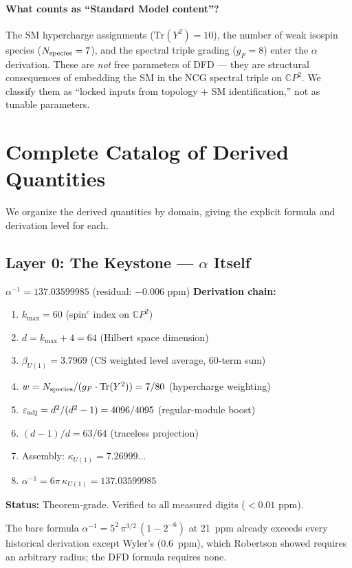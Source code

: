 \documentclass[12pt,a4paper]{article}
\newcommand{\CP}{\mathbb{C}P}
\newcommand{\Tr}{\mathrm{Tr}}
\begin{document}
\paragraph{What counts as ``Standard Model content''?}
The SM hypercharge assignments ($\Tr(Y^2) = 10$), the number of weak
isospin species ($N_{\rm species} = 7$), and the spectral triple grading
($g_F = 8$) enter the $\alpha$ derivation.  These are \textit{not} free
parameters of DFD --- they are structural consequences of embedding the SM
in the NCG spectral triple on $\CP^2$.  We classify them as ``locked
inputs from topology + SM identification,'' not as tunable parameters.

\section{Complete Catalog of Derived Quantities}
\label{sec:catalog}

We organize the derived quantities by domain, giving the explicit formula
and derivation level for each.

\subsection{Layer 0: The Keystone --- $\alpha$ Itself}

\begin{rosettabox}{$\alpha^{-1} = 137.03599985$ \quad (residual: $-0.006$ ppm)}
\textbf{Derivation chain:}
\begin{enumerate}[nosep]
\item $k_{\max} = 60$ (spin$^c$ index on $\CP^2$)
\item $d = k_{\max} + 4 = 64$ (Hilbert space dimension)
\item $\beta_{U(1)} = 3.7969$ (CS weighted level average, 60-term sum)
\item $w = N_{\rm species}/(g_F \cdot \Tr(Y^2)) = 7/80$ (hypercharge weighting)
\item $\varepsilon_{\rm adj} = d^2/(d^2 - 1) = 4096/4095$ (regular-module boost)
\item $(d-1)/d = 63/64$ (traceless projection)
\item Assembly: $\kappa_{U(1)} = 7.26999\ldots$
\item $\alpha^{-1} = 6\pi\,\kappa_{U(1)} = 137.03599985$
\end{enumerate}
\textbf{Status:} Theorem-grade.  Verified to all measured digits ($< 0.01$ ppm).

\medskip\noindent
The bare formula $\alpha^{-1} = 5^2\,\pi^{3/2}\,(1 - 2^{-6})$ at 21~ppm
already exceeds every historical derivation except Wyler's (0.6~ppm), which
Robertson showed requires an arbitrary radius; the DFD formula requires none.
\end{rosettabox}
\end{document}
